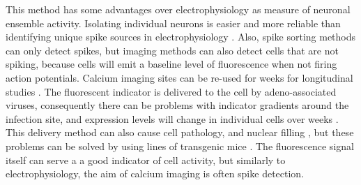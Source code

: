 This method has some advantages over electrophysiology as measure of neuronal ensemble activity. Isolating individual neurons is easier and more reliable than identifying unique spike sources in electrophysiology \parencite{buccino}. Also, spike sorting methods can only detect spikes, but imaging methods can also detect cells that are not spiking, because cells will emit a baseline level of fluorescence when not firing action potentials. Calcium imaging sites can be re-used for weeks for longitudinal studies \parencite{chen}. The fluorescent indicator is delivered to the cell by adeno-associated viruses, consequently there can be problems with indicator gradients around the infection site, and expression levels will change in individual cells over weeks \parencite{tian, chen}. This delivery method can also cause cell pathology, and nuclear filling \parencite{zariwala}, but these problems can be solved by using lines of transgenic mice \parencite{dana}. The fluorescence signal itself can serve a a good indicator of cell activity, but similarly to electrophysiology, the aim of calcium imaging is often spike detection.

